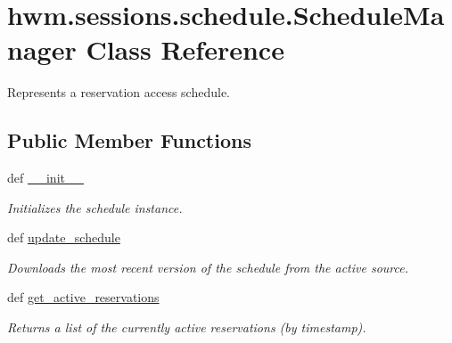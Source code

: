 \hypertarget{classhwm_1_1sessions_1_1schedule_1_1_schedule_manager}{\section{hwm.\-sessions.\-schedule.\-Schedule\-Manager Class Reference}
\label{classhwm_1_1sessions_1_1schedule_1_1_schedule_manager}
}


Represents a reservation access schedule.  


\subsection*{Public Member Functions}
\begin{DoxyCompactItemize}
\item 
def \hyperlink{classhwm_1_1sessions_1_1schedule_1_1_schedule_manager_a0143ac24564e0a7176921772f522acf4}{\-\_\-\-\_\-init\-\_\-\-\_\-}
\begin{DoxyCompactList}\small\item\em Initializes the schedule instance. \end{DoxyCompactList}\item 
def \hyperlink{classhwm_1_1sessions_1_1schedule_1_1_schedule_manager_a796d64f28ba7cf37b1958077aba60a09}{update\-\_\-schedule}
\begin{DoxyCompactList}\small\item\em Downloads the most recent version of the schedule from the active source. \end{DoxyCompactList}\item 
def \hyperlink{classhwm_1_1sessions_1_1schedule_1_1_schedule_manager_a8d1904cfc12d70c97ac0ad66d02b57b4}{get\-\_\-active\-\_\-reservations}
\begin{DoxyCompactList}\small\item\em Returns a list of the currently active reservations (by timestamp). \end{DoxyCompactList}\end{DoxyCompactItemize}
